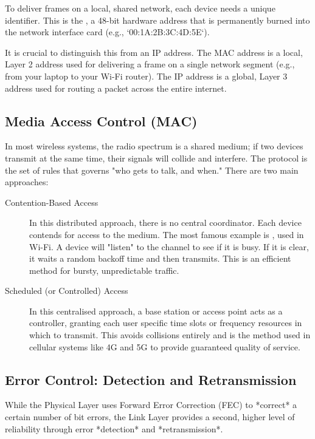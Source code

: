 To deliver frames on a local, shared network, each device needs a unique identifier. This is the , a 48-bit hardware address that is permanently burned into the network interface card (e.g., `00:1A:2B:3C:4D:5E`).

It is crucial to distinguish this from an IP address. The MAC address is a local, Layer 2 address used for delivering a frame on a single network segment (e.g., from your laptop to your Wi-Fi router). The IP address is a global, Layer 3 address used for routing a packet across the entire internet.

\subsection{Media Access Control (MAC)}

In most wireless systems, the radio spectrum is a shared medium; if two devices transmit at the same time, their signals will collide and interfere. The  protocol is the set of rules that governs "who gets to talk, and when." There are two main approaches:
\begin{description}
    \item[Contention-Based Access] In this distributed approach, there is no central coordinator. Each device contends for access to the medium. The most famous example is , used in Wi-Fi. A device will "listen" to the channel to see if it is busy. If it is clear, it waits a random backoff time and then transmits. This is an efficient method for bursty, unpredictable traffic.
    \item[Scheduled (or Controlled) Access] In this centralised approach, a base station or access point acts as a controller, granting each user specific time slots or frequency resources in which to transmit. This avoids collisions entirely and is the method used in cellular systems like 4G and 5G to provide guaranteed quality of service.
\end{description}

\subsection{Error Control: Detection and Retransmission}

While the Physical Layer uses Forward Error Correction (FEC) to *correct* a certain number of bit errors, the Link Layer provides a second, higher level of reliability through error *detection* and *retransmission*.

